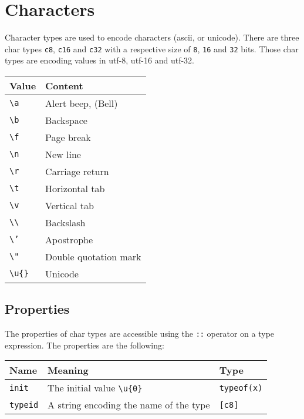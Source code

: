 \section{Characters}
\label{sec:org344e87e}

Character types are used to encode characters (ascii, or unicode). There are
three char types \texttt{c8}, \texttt{c16} and \texttt{c32} with a respective size of \texttt{8}, \texttt{16} and
\texttt{32} bits. Those char types are encoding values in utf-8, utf-16 and utf-32.


\begin{center}
  \vspace{-5pt}
  \begin{tabular}{ll}
    Value & Content\\[0pt]
    \hline
    \texttt{\textbackslash{}a} & Alert beep, (Bell)\\[0pt]
    \texttt{\textbackslash{}b} & Backspace\\[0pt]
    \texttt{\textbackslash{}f} & Page break\\[0pt]
    \texttt{\textbackslash{}n} & New line\\[0pt]
    \texttt{\textbackslash{}r} & Carriage return\\[0pt]
    \texttt{\textbackslash{}t} & Horizontal tab\\[0pt]
    \texttt{\textbackslash{}v} & Vertical tab\\[0pt]
    \texttt{\textbackslash{}\textbackslash{}} & Backslash\\[0pt]
    \texttt{\textbackslash{}'} & Apostrophe\\[0pt]
    \texttt{\textbackslash{}"} & Double quotation mark\\[0pt]
    \texttt{\textbackslash{}u\{\}} & Unicode\\[0pt]
  \end{tabular}
\end{center}

\subsection{Properties}
\label{sec:orgf9fbc31}

The properties of char types are accessible using the \texttt{::} operator on a type expression. The properties are the following:

\begin{center}
  \vspace{-5pt}
  \begin{adjustbox}{max width=\linewidth}
    \begin{tabular}{|l|ll|}
      \hline
      Name & Meaning & Type\\[0pt]
      \hline
      \hline
      \texttt{init} & The initial value \texttt{\textbackslash{}u\{0\}} & \texttt{typeof(x)}\\[0pt]
      \hline
      \texttt{typeid} & A string encoding the name of the type & \texttt{[c8]}\\[0pt]
      \hline
    \end{tabular}
  \end{adjustbox}
\end{center}


